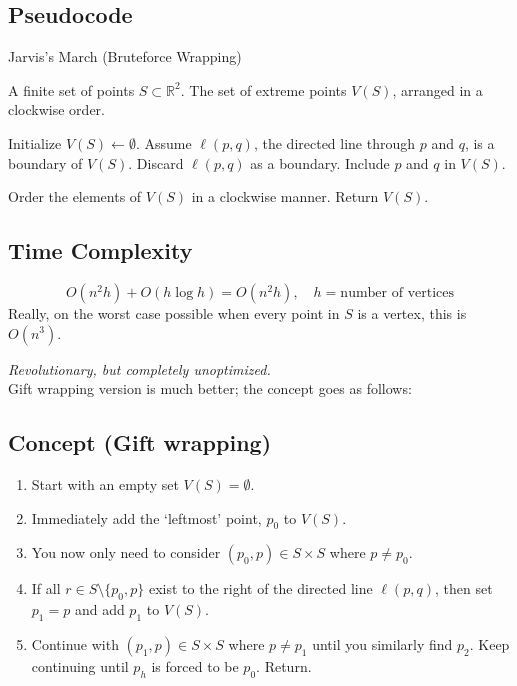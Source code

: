 \documentclass[12pt]{article}
\begin{document}
\newpage

\subsection*{Pseudocode}
\begin{algorithm}
\caption{Jarvis’s March (Bruteforce Wrapping) }
\begin{algorithmic}[1]
\Require A finite set of points \( S \subset \mathbb{R}^2 \).
\Ensure The set of extreme points \( V(S) \), arranged in a clockwise order.

\State Initialize \( V(S) \gets \emptyset \).
    \State Assume \( \ell(p, q) \), the directed line through \( p \) and \( q \), is a boundary of \( V(S) \).
            \State Discard \( \ell(p, q) \) as a boundary.
        \EndIf
    \EndFor
        \State Include \( p \) and \( q \) in \( V(S) \).
    \EndIf
\EndFor

\State Order the elements of \( V(S) \) in a clockwise manner.
\State Return \( V(S) \).
\end{algorithmic}
\end{algorithm}


\subsection*{Time Complexity}
\[
O(n^{2}h) + O(h \log h) = O(n^{2}h), \quad h = \text{number of vertices}
\]
Really, on the worst case possible when every point in $S$ is a vertex, this is $O(n^3)$.

\textit{Revolutionary, but completely unoptimized.}\\
Gift wrapping version is much better; the concept goes as follows:

\subsection*{Concept (Gift wrapping)}
\begin{enumerate}
    \item Start with an empty set $V(S) = \emptyset$.
    \item Immediately add the `leftmost' point, $p_{0}$ to $V(S)$.
    \item You now only need to consider $(p_{0},p) \in S \times S$ where $p \neq p_{0}$.
    \item If all $r \in S\setminus\{p_{0},p\}$ exist to the right of the directed line $\ell(p,q)$, then set $p_{1} = p$ and add $p_{1}$ to $V(S)$.
    \item Continue with $(p_{1},p) \in S \times S$ where $p \neq p_{1}$ until you similarly find $p_{2}$. Keep continuing until $p_{h}$ is forced to be $p_{0}$. Return.
\end{enumerate}
\end{document}
